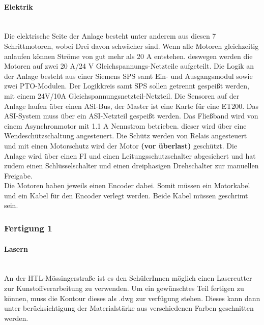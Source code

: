 \paragraph{Elektrik}\mbox{}\\
Die elektrische Seite der Anlage besteht unter anderem aus diesen 7 Schrittmotoren, wobei Drei davon schwächer sind. Wenn alle Motoren gleichzeitig anlaufen können Ströme von gut mehr als 20 A entstehen. deswegen werden die Motoren auf zwei 20 A/24 V Gleichspannungs-Netzteile aufgeteilt. Die Logik an der Anlage besteht aus einer Siemens SPS samt Ein- und Ausgangsmodul sowie zwei PTO-Modulen. Der Logikkreis samt SPS sollen getrennt gespeißt werden, mit einem 24V/10A Gleichspannungsnetzteil-Netzteil. Die Sensoren auf der Anlage laufen über einen ASI-Bus, der Master ist eine Karte für eine ET200. Das ASI-System muss über ein ASI-Netzteil gespeißt werden. Das Fließband wird von einem Asynchronmotor mit 1.1 A Nennstrom betrieben. dieser wird über eine Wendeschützschaltung angesteuert. Die Schütz werden von Relais angesteuert und mit einen Motorschutz wird der Motor \textbf{(vor überlast)} geschützt. Die Anlage wird über einen FI und einen Leitungsschutzschalter abgesichert und hat zudem einen Schlüsselschalter und einen dreiphasigen Drehschalter zur manuellen Freigabe.\\
Die Motoren haben jeweils einen Encoder dabei. Somit müssen ein Motorkabel und ein Kabel für den Encoder verlegt werden. Beide Kabel müssen geschrimt sein. 



\subsubsection{Fertigung 1}

\paragraph{Lasern}\mbox{}\\
An der HTL-Mössingerstraße ist es den SchülerInnen möglich einen Lasercutter zur Kunstoffverarbeitung zu verwenden. Um ein gewünschtes Teil fertigen zu können, muss die Kontour dieses als .dwg zur verfügung stehen. Dieses kann dann unter berücksichtigung der Materialstärke aus verschiedenen Farben geschnitten werden.



